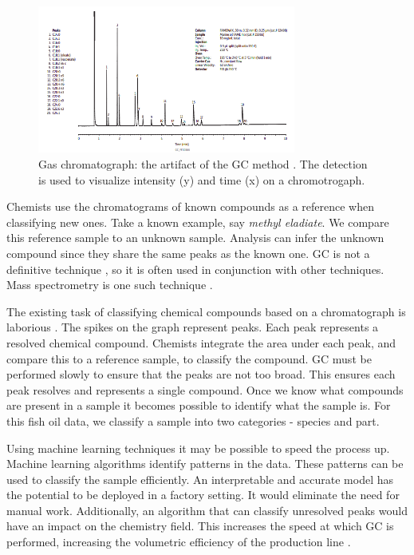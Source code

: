 \documentclass[runningheads]{llncs}
\begin{document}
\begin{figure}[htb]
  \centering
  \includegraphics[width=8.5cm]{chromatograph.png}
  \caption{
    Gas chromatograph: the artifact of the GC method \cite{restek2018high}.
    The detection is used to visualize intensity (y) and time (x) on a chromotrogaph.}
  \label{fig:gas-chromatography} 
  \captionsetup[figure]{font=small,labelfont=small}
\end{figure}

Chemists use the chromatograms of known compounds as a reference when classifying new ones.
Take a known example, say \emph{methyl eladiate}.
We compare this reference sample to an unknown sample.
Analysis can infer the unknown compound since they share the same peaks as the known one.
GC is not a definitive technique \cite{khan2013gas}, so it is often used in conjunction with other techniques.
Mass spectrometry is one such technique \cite{restek2018high}.

The existing task of classifying chemical compounds based on a chromatograph is laborious \cite{eder1995gas,restek2018high}.
The spikes on the graph represent peaks.
Each peak represents a resolved chemical compound.
Chemists integrate the area under each peak, and compare this to a reference sample, to classify the compound.
GC must be performed slowly to ensure that the peaks are not too broad.
This ensures each peak resolves and represents a single compound.
Once we know what compounds are present in a sample it becomes possible to identify what the sample is.
For this fish oil data, we classify a sample into two categories - species and part. 

Using machine learning techniques it may be possible to speed the process up.
Machine learning algorithms identify patterns in the data.
These patterns can be used to classify the sample efficiently.
An interpretable and accurate model has the potential to be deployed in a factory setting.
It would eliminate the need for manual work.
Additionally, an algorithm that can classify unresolved peaks would have an impact on the chemistry field.
This increases the speed at which GC is performed, increasing the volumetric efficiency of the production line \cite{musk2020battery}.
\end{document}
